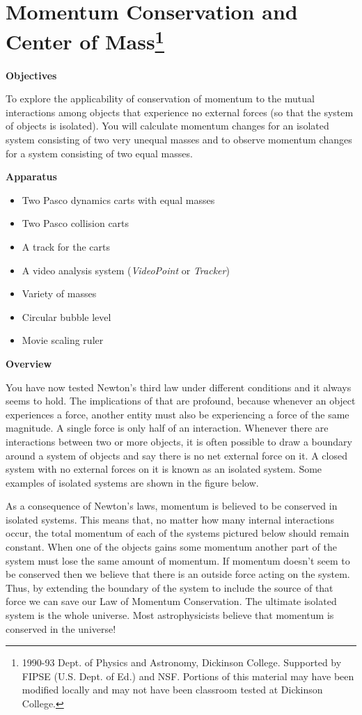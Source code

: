 
\section{Momentum Conservation and Center of Mass\footnote{
1990-93 Dept. of Physics and Astronomy, Dickinson College. Supported by FIPSE
(U.S. Dept. of Ed.) and NSF. Portions of this material may have been modified
locally and may not have been classroom tested at Dickinson College.
}}

\makelabheader %

\textbf{Objectives }

To explore the applicability of conservation of momentum to the mutual interactions
among objects that experience no external forces (so that the system of objects
is isolated). You will calculate momentum changes for an isolated system consisting
of two very unequal masses and to observe momentum changes for a system consisting
of two equal masses. 

\textbf{Apparatus}

\begin{itemize}
\item Two Pasco dynamics carts with equal masses
\item Two Pasco collision carts
\item A track for the carts
\item A video analysis system (\textit{VideoPoint} or \textit{Tracker})
\item Variety of masses
\item Circular bubble level
\item Movie scaling ruler
\end{itemize}
\textbf{Overview }

You have now tested Newton's third law under different conditions and it always
seems to hold. The implications of that are profound, because whenever an object
experiences a force, another entity must also be experiencing a force of the
same magnitude. A single force is only half of an interaction. Whenever there
are interactions between two or more objects, it is often possible to draw a
boundary around a system of objects and say there is no net external force on
it. A closed system with no external forces on it is known as an isolated system.
Some examples of isolated systems are shown in the figure below.

As a consequence of Newton's laws, momentum is believed to be conserved in isolated
systems. This means that, no matter how many internal interactions occur, the
total momentum of each of the systems pictured below should remain constant.
When one of the objects gains some momentum another part of the system must
lose the same amount of momentum. If momentum doesn't seem to be conserved then
we believe that there is an outside force acting on the system. Thus, by extending
the boundary of the system to include the source of that force we can save our
Law of Momentum Conservation. The ultimate isolated system is the whole universe.
Most astrophysicists believe that momentum is conserved in the universe!

